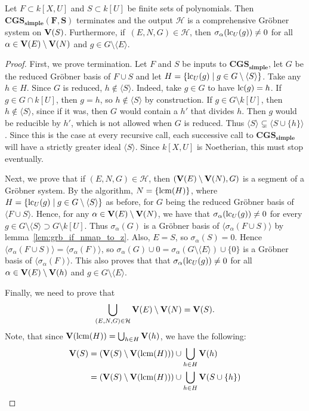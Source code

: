 \begin{theorem}\label{thm:CGS_simple}
  Let $F \subset k[X, U]$ and $S \subset k[U]$ be finite sets of polynomials. Then $\mathbf{CGS_{simple}(F, S)}$ terminates and the output $\mathcal H$ is a comprehensive Gröbner system on $\operatorname{\mathbf V}(S)$. Furthermore, if $\,(E, N, G) \in \mathcal H$, then $\sigma_{\alpha}(\operatorname{lc}_{U}(g)) \neq 0$ for all $\alpha \in \operatorname{\mathbf V}(E) \setminus \operatorname{\mathbf V}(N)$ and $g \in G \setminus \langle E \rangle$.
\end{theorem}
\begin{proof}
  First, we prove termination. Let $F$ and $S$ be inputs to $\mathbf{CGS_{simple}}$, let $G$ be the reduced Gröbner basis of $F \cup S$ and let $H = \{\operatorname{lc}_{U}(g) \mid g \in G \setminus \langle S \rangle\}$. Take any $h \in H$. Since $G$ is reduced, $h \notin \langle S \rangle$. Indeed, take $g \in G$ to have $\operatorname{lc}(g) = h$. If $g \in G \cap k[U]$, then $g = h$, so $h \notin \langle S \rangle$ by construction. If $g \in G \setminus k[U]$, then $h \notin \langle S \rangle$, since if it was, then $G$ would contain a $h'$ that divides $h$. Then $g$ would be reducible by $h'$, which is not allowed when $G$ is reduced. Thus $\langle S \rangle \subsetneq \langle S \cup \{h\} \rangle$. Since this is the case at every recursive call, each successive call to $\mathbf{CGS_{simple}}$ will have a strictly greater ideal $\langle S \rangle$. Since $k[X, U]$ is Noetherian, this must stop eventually.

  Next, we prove that if $(E, N, G) \in \mathcal H$, then $(\operatorname{\mathbf V}(E) \setminus \operatorname{\mathbf V}(N), G)$ is a segment of a Gröbner system. By the algorithm, $N = \{\operatorname{lcm}(H)\}$, where $H = \{\operatorname{lc}_{U}(g) \mid g \in G \setminus \langle S \rangle\}$ as before, for $G$ being the reduced Gröbner basis of $\langle F \cup S \rangle$. Hence, for any $\alpha \in \operatorname{\mathbf V}(E) \setminus \operatorname{\mathbf V}(N)$, we have that $\sigma_{\alpha}(\operatorname{lc}_{U}(g)) \neq 0$ for every $g \in G \setminus \langle S \rangle \supset G \setminus k[U]$. Thus $\sigma_{\alpha}(G)$ is a Gröbner basis of $\langle \sigma_{\alpha}(F \cup S) \rangle$ by lemma~\ref{lem:grb_if_nmap_to_z}. Also, $E = S$, so $\sigma_{\alpha}(S) = 0$. Hence $\langle \sigma_{\alpha}(F \cup S) \rangle = \langle \sigma_{\alpha}(F) \rangle$, so $\sigma_{\alpha}(G) \cup 0 = \sigma_{\alpha}(G \setminus \langle E \rangle) \cup \{0\}$ is a Gröbner basis of $\langle \sigma_{\alpha}(F) \rangle$. This also proves that that $\sigma_{\alpha}(\operatorname{lc}_{U}(g)) \neq 0$ for all $\alpha \in \operatorname{\mathbf V}(E) \setminus \operatorname{\mathbf V}(h)$ and $g \in G \setminus \langle E \rangle$.

  Finally, we need to prove that \[\bigcup_{(E, N, G) \in \mathcal H} \operatorname{\mathbf V}(E) \setminus \operatorname{\mathbf V}(N) = \operatorname{\mathbf V}(S).\]
  Note, that since $\operatorname{\mathbf V}(\operatorname{lcm}(H)) = \bigcup_{h \in H} \operatorname{\mathbf V}(h)$, we have the following:
  \begin{align*}
    \operatorname{\mathbf V}(S) &= (\operatorname{\mathbf V}(S) \setminus \operatorname{\mathbf V}(\operatorname{lcm}(H))) \cup \bigcup_{h \in H} \operatorname{\mathbf V}(h) \\
    &= (\operatorname{\mathbf V}(S) \setminus \operatorname{\mathbf V}(\operatorname{lcm}(H))) \cup \bigcup_{h \in H} \operatorname{\mathbf V}(S \cup \{h\})
  \end{align*}


\end{proof}

